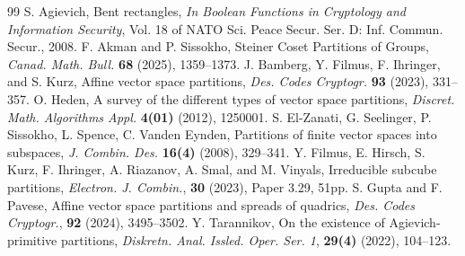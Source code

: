 \documentclass[11pt]{amsart}
\begin{document}
\begin{thebibliography}{99}	
 S. Agievich, Bent rectangles, {\it In Boolean Functions in Cryptology and Information Security}, Vol. 18 of NATO Sci. 
Peace Secur. Ser. D: Inf. Commun. Secur., 2008.
 F. Akman and P. Sissokho,  Steiner Coset Partitions of Groups, {\it Canad. Math. Bull.} {\bf 68} (2025), 1359--1373.
 J. Bamberg, Y. Filmus, F. Ihringer, and S. Kurz, Affine vector space partitions, {\it Des. Codes Cryptogr.} {\bf 93} (2023), 331--357.
 O. Heden, A survey of the different types of vector space partitions, {\it Discret. Math. Algorithms Appl.}
{\bf 4(01)} (2012), 1250001.
 S. El-Zanati, G. Seelinger, P. Sissokho, L. Spence, C. Vanden Eynden, Partitions of
finite vector spaces into subspaces, {\it J. Combin. Des.} {\bf 16(4)} (2008), 329--341.
 Y. Filmus, E. Hirsch, S. Kurz, F. Ihringer, A. Riazanov, A. Smal, and M. Vinyals, 
Irreducible subcube partitions, {\it Electron. J. Combin.}, {\bf 30} (2023), Paper 3.29, 51pp.
 S. Gupta and F. Pavese,  Affine vector space partitions and spreads of quadrics, {\it Des. Codes Cryptogr.}, {\bf 92} (2024), 3495--3502.
 Y. Tarannikov, On the existence of Agievich-primitive partitions, {\it Diskretn. Anal. Issled. Oper. Ser. 1}, {\bf 29(4)} (2022), 104--123.
 \end{thebibliography} 
\end{document}
